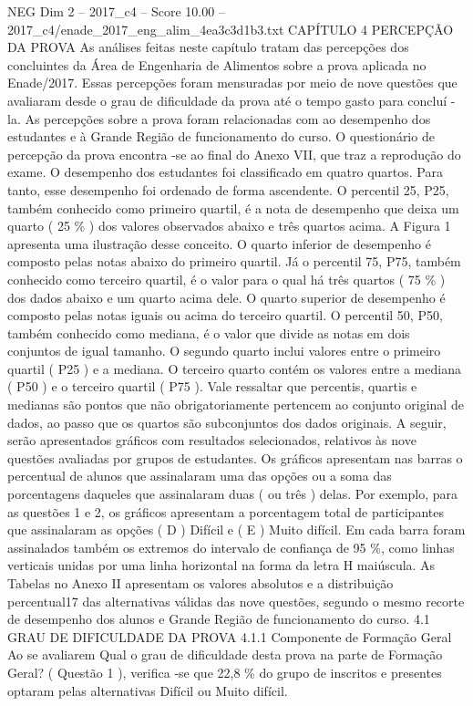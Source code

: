\begin{textsample}{NEG Dim 2 – 2017\_c4 – Score 10.00 – 2017\_c4/enade\_2017\_eng\_alim\_4ea3c3d1b3.txt}  \label{ex:f2_neg_341}
CAPÍTULO 4 PERCEPÇÃO DA PROVA As análises feitas neste capítulo tratam das percepções dos concluintes da Área de Engenharia de Alimentos sobre a prova aplicada no Enade/2017.
Essas percepções foram mensuradas por meio de nove questões que avaliaram desde o grau de dificuldade da prova até o tempo gasto para concluí -la.
As percepções sobre a prova foram relacionadas com ao desempenho dos estudantes e à Grande Região de funcionamento do curso.
O questionário de percepção da prova encontra -se ao final do Anexo VII, que traz a reprodução do exame.
O desempenho dos estudantes foi classificado em quatro quartos.
Para tanto, esse desempenho foi ordenado de forma ascendente.
O percentil 25, P25, também conhecido como primeiro quartil, é a nota de desempenho que deixa um quarto ( 25 \% ) dos valores observados abaixo e três quartos acima.
A Figura 1 apresenta uma ilustração desse conceito.
O quarto inferior de desempenho é composto pelas notas abaixo do primeiro quartil.
Já o percentil 75, P75, também conhecido como terceiro quartil, é o valor para o qual há três quartos ( 75 \% ) dos dados abaixo e um quarto acima dele.
O quarto superior de desempenho é composto pelas notas iguais ou acima do terceiro quartil.
O percentil 50, P50, também conhecido como mediana, é o valor que divide as notas em dois conjuntos de igual tamanho.
O segundo quarto inclui valores entre o primeiro quartil ( P25 ) e a mediana.
O terceiro quarto contém os valores entre a mediana ( P50 ) e o terceiro quartil ( P75 ).
Vale ressaltar que percentis, quartis e medianas são pontos que não obrigatoriamente pertencem ao conjunto original de dados, ao passo que os quartos são subconjuntos dos dados originais.
A seguir, serão apresentados gráficos com resultados selecionados, relativos às nove questões avaliadas por grupos de estudantes.
Os gráficos apresentam nas barras o percentual de alunos que assinalaram uma das opções ou a soma das porcentagens daqueles que assinalaram duas ( ou três ) delas.
Por exemplo, para as questões 1 e 2, os gráficos apresentam a porcentagem total de participantes que assinalaram as opções ( D ) Difícil e ( E ) Muito difícil.
Em cada barra foram assinalados também os extremos do intervalo de confiança de 95 \%, como linhas verticais unidas por uma linha horizontal na forma da letra H maiúscula.
As Tabelas no Anexo II apresentam os valores absolutos e a distribuição percentual17 das alternativas válidas das nove questões, segundo o mesmo recorte de desempenho dos alunos e Grande Região de funcionamento do curso. 4.1 GRAU DE DIFICULDADE DA PROVA 4.1.1 Componente de Formação Geral Ao se avaliarem Qual o grau de dificuldade desta prova na parte de Formação Geral? ( Questão 1 ), verifica -se que 22,8 \% do grupo de inscritos e presentes optaram pelas alternativas Difícil ou Muito difícil.

\end{textsample}

